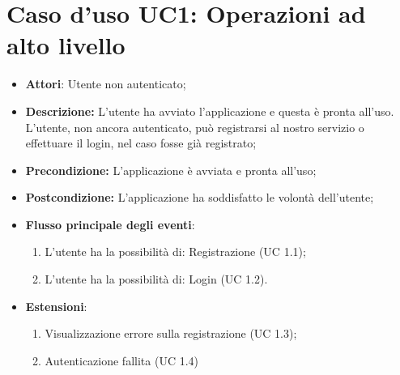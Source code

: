 \section{Caso d'uso UC1: Operazioni ad alto livello}
\begin{itemize}
	\item \textbf{Attori}: Utente non autenticato;
	\item \textbf{Descrizione:} L'utente ha avviato l'applicazione e questa è pronta all'uso. L'utente, non ancora autenticato, può registrarsi al nostro servizio o effettuare il login, nel caso fosse già registrato;
	\item \textbf{Precondizione:} L'applicazione è avviata e pronta all'uso;
	\item \textbf{Postcondizione:} L'applicazione ha soddisfatto le volontà dell'utente;
	\item \textbf{Flusso principale degli eventi}:
		\begin{enumerate}
			\item L'utente ha la possibilità di: Registrazione (UC 1.1);
			\item L'utente ha la possibilità di: Login (UC 1.2).
		\end{enumerate}
	\item \textbf{Estensioni}:
		\begin{enumerate}
			\item Visualizzazione errore sulla registrazione (UC 1.3);
			\item Autenticazione fallita (UC 1.4)
		\end{enumerate}
\end{itemize}